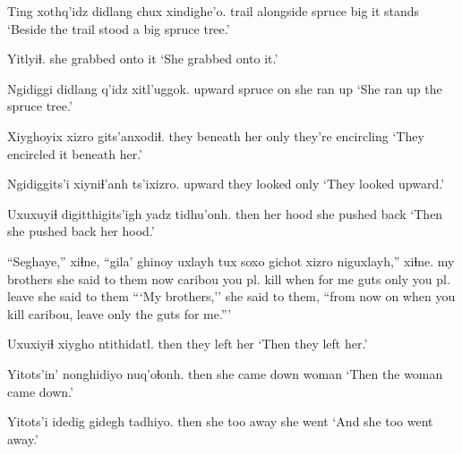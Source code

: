 \documentclass[12pt]{article}
\begin{document}
\gll Ting xothq'idz didlang chux xindighe'o.
trail alongside  spruce  big {it stands}
\glt `Beside the trail stood a big spruce tree.'
\glend

\gll Yitlyiɬ.
{{she grabbed onto it}}
\glt `She grabbed onto it.'
\glend

\gll Ngidiggi didlang q'idz xitl'uggok.
upward  spruce  on {she ran up}
\glt `She ran up the spruce tree.'
\glend

\gll Xiyghoyix xizro gits'anxodiɬ.
{they beneath her} only {they're encircling}
\glt `They encircled it beneath her.'
\glend

\gll Ngidiggits'i xiyniɬ'anh ts'ixizro.
upward  {they looked} only
\glt `They looked upward.'
\glend

\gll Uxuxuyiɬ digitthigits'igh {yadz tidhu'onh.}
then  {her hood} {she pushed back}
\glt `Then she pushed back her hood.'
\glend

\gll ``Seghaye,'' xiɬne, ``gila' ghinoy uxlayh tux  soxo gichot xizro  niguxlayh,'' xiɬne.
{my brothers} {she said to them} now caribou  {you pl. kill} when {for me} guts  only  {you pl. leave}  {she said to them}
\glt ```My brothers,'' she said to them, ``from now on when you kill caribou, leave only the guts for me.'''
\glend

\gll Uxuxiyiɬ {xiygho ntithidatl.}
then  {they left her}
\glt `Then they left her.'
\glend

\gll Yitots'in' nonghidiyo  nuq'oɬonh.
then  {she came down} woman
\glt `Then the woman came down.'
\glend

\gll Yitots'i idedig gidegh tadhiyo.
then  {she too}  away {she went}
\glt `And she too went away.'
\glend
\end{document}
